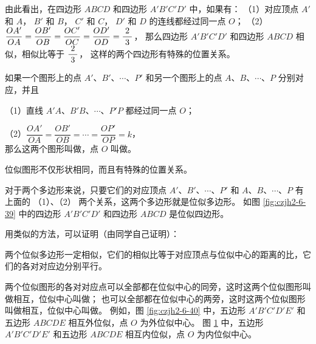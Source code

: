 \begin{enhancedline}
由此看出，在四边形 $ABCD$ 和四边形 $A'B'C'D'$ 中，如果有：
（1）对应顶点 $A'$ 和 $A$， $B'$ 和 $B$， $C'$ 和 $C$， $D'$ 和 $D$ 的连线都经过同一点 $O$；
（2）$\dfrac{OA'}{OA} = \dfrac{OB'}{OB} = \dfrac{OC'}{OC} = \dfrac{OD'}{OD} = \dfrac{\; 2 \;}{3}$，
那么四边形 $A'B'C'D'$ 和四边形 $ABCD$ 相似，相似比等于 $\dfrac{\; 2 \;}{3}$，
这样的两个四边形有特殊的位置关系。

如果一个图形上的点 $A'$、$B'$、$\cdots$、$P'$ 和另一个图形上的点 $A$、$B$、$\cdots$、$P$ 分别对应，并且

（1）直线 $A'A$、$B'B$、$\cdots$、$P'P$ 都经过同一点 $O$；

（2）$\dfrac{OA'}{OA} = \dfrac{OB'}{OB} = \cdots = \dfrac{OP'}{OP} = k$，\\
那么这两个图形叫做，点 $O$ 叫做。

位似图形不仅形状相同，而且有特殊的位置关系。

对于两个多边形来说，只要它们的对应顶点 $A'$、$B'$、$\cdots$、$P'$ 和 $A$、$B$、$\cdots$、$P$ 有
上面的 （1）、（2） 两个关系，这两个多边形就是位似多边形。
如图 \ref{fig:czjh2-6-39} 中的四边形 $A'B'C'D'$ 和四边形 $ABCD$ 是位似四边形。

用类似的方法，可以证明（由同学自己证明）：

\begin{xingzhi}
    两个位似多边形一定相似，它们的相似比等于对应顶点与位似中心的距离的比，它们的各对对应边分别平行。
\end{xingzhi}

两个位似图形的各对对应点可以全部都在位似中心的同旁，这时这两个位似图形叫做相互，位似中心叫做；
也可以全部都在位似中心的两旁，这时这两个位似图形叫做相互，位似中心叫做。
例如，图 \ref{fig:czjh2-6-40} 中，五边形 $A'B'C'D'E'$ 和五边形 $ABCDE$ 相互外位似，点 $O$ 为外位似中心。
图 \ref{fig:czjh2-6-41} 中，五边形 $A'B'C'D'E'$ 和五边形 $ABCDE$ 相互内位似，点 $O$ 为内位似中心。

\begin{figure}[htbp]
    \centering
    \begin{minipage}[b]{7cm}
        \centering
        
        \caption{}\label{fig:czjh2-6-40}
    \end{minipage}
    \qquad
    \begin{minipage}[b]{7cm}
        \centering
        
        \caption{}\label{fig:czjh2-6-41}
    \end{minipage}
\end{figure}


\end{enhancedline}
